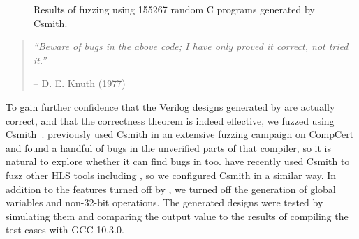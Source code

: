 \begin{figure}
  \centering

  \caption{Results of fuzzing \vericert{} using 155267 random C programs generated by Csmith.}\label{tab:fuzzing}
\end{figure}

\begin{quotation}
  \textit{\enquote{Beware of bugs in the above code; I have only proved it
      correct, not tried it.}}\par\hfill -- D. E. Knuth (1977)
\end{quotation}

\noindent To gain further confidence that the Verilog designs generated by
\vericert{} are actually correct, and that the correctness theorem is indeed
effective, we fuzzed \vericert{} using
Csmith~\cite{yang11_findin_under_bugs_c_compil}. \citeauthor{yang11_findin_under_bugs_c_compil}
previously used Csmith in an extensive fuzzing campaign on CompCert and found a
handful of bugs in the unverified parts of that compiler, so it is natural to
explore whether it can find bugs in \vericert{} too. \citet{herklotz21_esrhlst}
have recently used Csmith to fuzz other HLS tools including \legup{}, so we
configured Csmith in a similar way. In addition to the features turned off by
\citeauthor{herklotz21_esrhlst}, we turned off the generation of global
variables and non-32-bit operations. The generated designs were tested by
simulating them and comparing the output value to the results of compiling the
test-cases with GCC 10.3.0.

